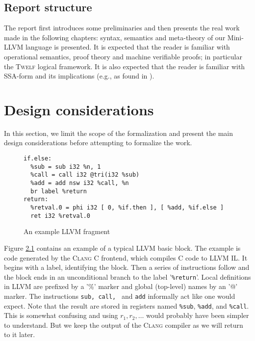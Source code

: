 \documentclass[a4paper, oneside, 10pt, draft]{memoir}
\newcommand{\clang}{\textsc{Clang}}
\newcommand{\twelf}{\textsc{Twelf}}
\begin{document}
\section{Report structure}

The report first introduces some preliminaries and then presents the
real work made in the following chapters: syntax, semantics and
meta-theory of our Mini-LLVM language is presented. It is expected
that the reader is familiar with operational semantics, proof theory
and machine verifiable proofs; in particular the \twelf{} logical
framework. It is also expected that the reader is familiar with
SSA-form and its implications (e.g., as found in
\cite[Chapter 19]{appel:1998:modern}).

\chapter{Design considerations}

In this section, we limit the scope of the formalization and present
the main design considerations before attempting to formalize the work.

\begin{figure}
\begin{verbatim}
if.else:
  %sub = sub i32 %n, 1
  %call = call i32 @tri(i32 %sub)
  %add = add nsw i32 %call, %n
  br label %return
return:
  %retval.0 = phi i32 [ 0, %if.then ], [ %add, %if.else ]
  ret i32 %retval.0

\end{verbatim}
  \caption{An example LLVM fragment}
  \label{fig:llvm-example-1}
\end{figure}

Figure \ref{fig:llvm-example-1} contains an example of a typical LLVM
basic block. The example is code generated by the \clang{} C frontend,
which compiles C code to LLVM IL. It begins with a label, identifying
the block. Then a series of instructions follow and the block ends in
an unconditional branch to the label '\texttt{\%return}'. Local
definitions in LLVM are prefixed by a '\%' marker and global
(top-level) names by an '@' marker. The instructions \texttt{sub,
  call, } and \texttt{add} informally act like one would expect. Note
that the result are stored in registers named \texttt{\%sub},
\texttt{\%add}, and \texttt{\%call}. This is somewhat confusing and
using $r_1, r_2, \dotsc$ would probably have been simpler to
understand. But we keep the output of the \clang{} compiler as we will
return to it later.
\end{document}

